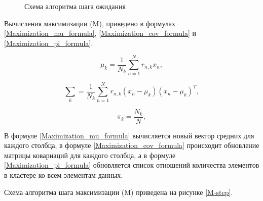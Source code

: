 \begin{figure}[H]
	\caption{Схема алгоритма шага ожидания}
	\label{E-step}
\end{figure}

Вычисления максимизации (M), приведено в формулах \ref{Maximization_mu_formula}, \ref{Maximization_cov_formula} и \ref{Maximization_pi_formula}.

\begin{equation}
\label{Maximization_mu_formula}
\mu_k = \frac{1}{N_k}\sum_{n=1}^{N}r_{n,k}x_n,
\end{equation}

\begin{equation}
\label{Maximization_cov_formula}
\sum_k = \frac{1}{N_k}\sum_{n=1}^{N}r_{n,k}(x_n - \mu_k)(x_n - \mu_k)^T,
\end{equation}

\begin{equation}
\label{Maximization_pi_formula}
\pi_k = \frac{N_k}{N},
\end{equation}

В формуле \ref{Maximization_mu_formula} вычисляется новый вектор средних для каждого столбца, в формуле \ref{Maximization_cov_formula} происходит обновление матрицы ковариаций для каждого столбца, а в формуле \ref{Maximization_pi_formula} обновляется список отношений количества элементов в кластере ко всем элементам данных.

Схема алгоритма шага максимизации (M) приведена на рисунке \ref{M-step}.

